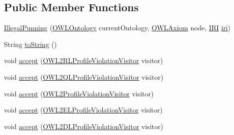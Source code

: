 \subsection*{Public Member Functions}
\begin{DoxyCompactItemize}
\item 
\hyperlink{classorg_1_1semanticweb_1_1owlapi_1_1profiles_1_1_illegal_punning_ab18de8ccedacfdf7d81a4bfee2986464}{Illegal\-Punning} (\hyperlink{interfaceorg_1_1semanticweb_1_1owlapi_1_1model_1_1_o_w_l_ontology}{O\-W\-L\-Ontology} current\-Ontology, \hyperlink{interfaceorg_1_1semanticweb_1_1owlapi_1_1model_1_1_o_w_l_axiom}{O\-W\-L\-Axiom} node, \hyperlink{classorg_1_1semanticweb_1_1owlapi_1_1model_1_1_i_r_i}{I\-R\-I} \hyperlink{classorg_1_1semanticweb_1_1owlapi_1_1profiles_1_1_illegal_punning_a83e7e402c399ade6ed8a894eb4005779}{iri})
\item 
String \hyperlink{classorg_1_1semanticweb_1_1owlapi_1_1profiles_1_1_illegal_punning_a53d5a3a2a3076099e7be3774ab289963}{to\-String} ()
\item 
void \hyperlink{classorg_1_1semanticweb_1_1owlapi_1_1profiles_1_1_illegal_punning_aae704f42e06df8939379f875866be1e3}{accept} (\hyperlink{interfaceorg_1_1semanticweb_1_1owlapi_1_1profiles_1_1_o_w_l2_r_l_profile_violation_visitor}{O\-W\-L2\-R\-L\-Profile\-Violation\-Visitor} visitor)
\item 
void \hyperlink{classorg_1_1semanticweb_1_1owlapi_1_1profiles_1_1_illegal_punning_a852f8cf10e6d094a343d3fd784e24ae1}{accept} (\hyperlink{interfaceorg_1_1semanticweb_1_1owlapi_1_1profiles_1_1_o_w_l2_q_l_profile_violation_visitor}{O\-W\-L2\-Q\-L\-Profile\-Violation\-Visitor} visitor)
\item 
void \hyperlink{classorg_1_1semanticweb_1_1owlapi_1_1profiles_1_1_illegal_punning_a5ba8fef5a918e3d0a2b9da34d430d66d}{accept} (\hyperlink{interfaceorg_1_1semanticweb_1_1owlapi_1_1profiles_1_1_o_w_l2_profile_violation_visitor}{O\-W\-L2\-Profile\-Violation\-Visitor} visitor)
\item 
void \hyperlink{classorg_1_1semanticweb_1_1owlapi_1_1profiles_1_1_illegal_punning_ade7bd6f3090bea429762e86a942c43c9}{accept} (\hyperlink{interfaceorg_1_1semanticweb_1_1owlapi_1_1profiles_1_1_o_w_l2_e_l_profile_violation_visitor}{O\-W\-L2\-E\-L\-Profile\-Violation\-Visitor} visitor)
\item 
void \hyperlink{classorg_1_1semanticweb_1_1owlapi_1_1profiles_1_1_illegal_punning_a9ac3f5ffc8dd8ae9abf5045c0825f172}{accept} (\hyperlink{interfaceorg_1_1semanticweb_1_1owlapi_1_1profiles_1_1_o_w_l2_d_l_profile_violation_visitor}{O\-W\-L2\-D\-L\-Profile\-Violation\-Visitor} visitor)
\end{DoxyCompactItemize}
